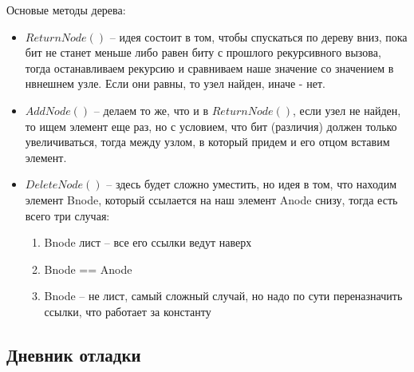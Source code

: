 \documentclass[12pt]{article}
\begin{document}
Основые методы дерева:
\begin{itemize}
    \item $ ReturnNode() $ -- идея состоит в том, чтобы спускаться по дереву вниз, пока бит не станет меньше либо равен биту с прошлого рекурсивного вызова, тогда останавливаем рекурсию и сравниваем наше значение со значением в нвнешнем узле. Если они равны, то узел найден, иначе - нет.
    \item $ AddNode() $ -- делаем то же, что и в $ ReturnNode() $, если узел не найден, то ищем элемент еще раз, но с условием, что бит (различия) должен только увеличиваться, тогда между узлом, в который придем и его отцом вставим элемент.
    \item $ DeleteNode() $ -- здесь будет сложно уместить, но идея в том, что находим элемент Bnode, который ссылается на наш элемент Anode снизу, тогда есть всего три случая:
    \begin{enumerate}
        \item Bnode лист -- все его ссылки ведут наверх
        \item Bnode == Anode
        \item Bnode -- не лист, самый сложный случай, но надо по сути переназначить ссылки, что работает за константу
    \end{enumerate}
\end{itemize}


\subsection*{Дневник отладки}
\end{document}
